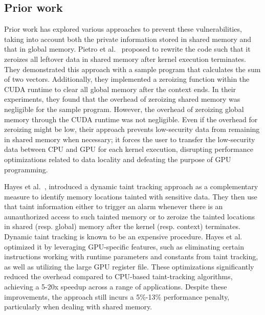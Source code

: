 \subsection{Prior work}
Prior work has explored various approaches to prevent these vulnerabilities, taking into account both the private information stored in shared memory and that in global memory.
%
Pietro et al.~\cite{pietro2016TECS} proposed to rewrite the code such that it zeroizes all leftover data in shared memory after kernel execution terminates.
%
They demonstrated this approach with a sample program that calculates the sum of two vectors.
%
Additionally, they implemented a zeroizing function within the CUDA runtime to clear all global memory after the context ends.
%
In their experiments, they found that the overhead of zeroizing shared memory was negligible for the sample program.
%
However, the overhead of zeroizing global memory through the CUDA runtime was not negligible.
%
Even if the overhead for zeroizing might be low, their approach prevents low-security data from remaining in shared memory when necessary; it forces the user to transfer the low-security data between CPU and GPU for each kernel execution, disrupting performance optimizations related to data locality and defeating the purpose of GPU programming.
%

%
Hayes et al.~\cite{hayes2017usenix}, introduced a dynamic taint tracking approach as a complementary measure to identify memory locations tainted with sensitive data.
%
They then use that taint information either to trigger an alarm whenever there is an aunauthorized access to such tainted memory or to zeroize the tainted locations in shared (resp. global) memory after the kernel (resp. context) terminates.
%
Dynamic taint tracking is known to be an expensive procedure. 
%
Hayes et al. optimized it by leveraging GPU-specific features, such as eliminating certain instructions working with runtime parameters and constants from taint tracking, as well as utilizing the large GPU register file.
%
These optimizations significantly reduced the overhead compared to CPU-based taint-tracking algorithms,  achieving a 5-20x speedup across a range of applications.
%
Despite these improvements, the approach still incurs a 5\%-13\% performance penalty, particularly when dealing with shared memory.

